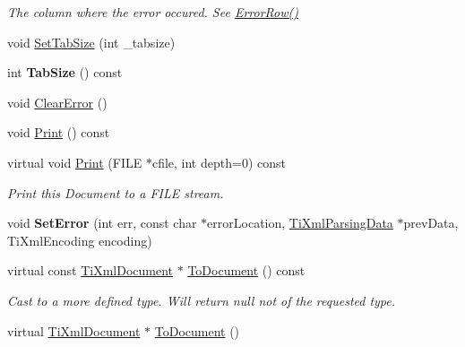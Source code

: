 \begin{DoxyCompactItemize}
\begin{DoxyCompactList}\small\item\em The column where the error occured. See \hyperlink{class_ti_xml_document_af30efc75e804aa2e92fb8be3a8cb676e}{Error\+Row()} \end{DoxyCompactList}\item 
void \hyperlink{class_ti_xml_document_a51dac56316f89b35bdb7d0d433ba988e}{Set\+Tab\+Size} (int \+\_\+tabsize)
\item 
\hypertarget{class_ti_xml_document_a612360241b85bad0826b2a9ae9cda561}{int {\bfseries Tab\+Size} () const }\label{class_ti_xml_document_a612360241b85bad0826b2a9ae9cda561}

\item 
void \hyperlink{class_ti_xml_document_ac66b8c28db86363315712a3574e87c35}{Clear\+Error} ()
\item 
void \hyperlink{class_ti_xml_document_af08389ec70ee9b2de7f800e206a18510}{Print} () const 
\item 
\hypertarget{class_ti_xml_document_a7b1aea204fee266b70b9c105c8bf2ada}{virtual void \hyperlink{class_ti_xml_document_a7b1aea204fee266b70b9c105c8bf2ada}{Print} (F\+I\+L\+E $\ast$cfile, int depth=0) const }\label{class_ti_xml_document_a7b1aea204fee266b70b9c105c8bf2ada}

\begin{DoxyCompactList}\small\item\em Print this Document to a F\+I\+L\+E stream. \end{DoxyCompactList}\item 
\hypertarget{class_ti_xml_document_a735c23e318597b920c94eae77fa206de}{void {\bfseries Set\+Error} (int err, const char $\ast$error\+Location, \hyperlink{class_ti_xml_parsing_data}{Ti\+Xml\+Parsing\+Data} $\ast$prev\+Data, Ti\+Xml\+Encoding encoding)}\label{class_ti_xml_document_a735c23e318597b920c94eae77fa206de}

\item 
\hypertarget{class_ti_xml_document_a1dc977bde3e4fe85a8eb9d88a35ef5a4}{virtual const \hyperlink{class_ti_xml_document}{Ti\+Xml\+Document} $\ast$ \hyperlink{class_ti_xml_document_a1dc977bde3e4fe85a8eb9d88a35ef5a4}{To\+Document} () const }\label{class_ti_xml_document_a1dc977bde3e4fe85a8eb9d88a35ef5a4}

\begin{DoxyCompactList}\small\item\em Cast to a more defined type. Will return null not of the requested type. \end{DoxyCompactList}\item 
\hypertarget{class_ti_xml_document_a1025d942a1f328fd742d545e37efdd42}{virtual \hyperlink{class_ti_xml_document}{Ti\+Xml\+Document} $\ast$ \hyperlink{class_ti_xml_document_a1025d942a1f328fd742d545e37efdd42}{To\+Document} ()}\label{class_ti_xml_document_a1025d942a1f328fd742d545e37efdd42}


\end{DoxyCompactItemize}
